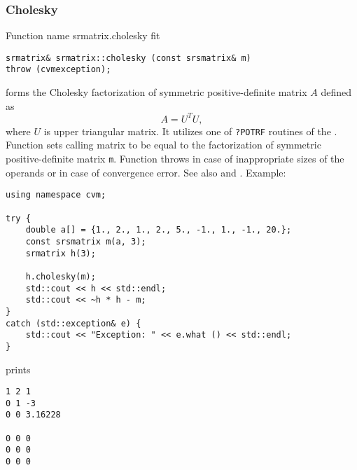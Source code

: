 \subsubsection{Cholesky}
Function%
\pdfdest name {srmatrix.cholesky} fit
\begin{verbatim}
srmatrix& srmatrix::cholesky (const srsmatrix& m)
throw (cvmexception);
\end{verbatim}
forms the Cholesky factorization of  symmetric positive-definite 
matrix $A$ defined as
\begin{equation*}
A=U^T U,
\end{equation*}
where $U$ is upper triangular matrix.
It utilizes one of \verb"?POTRF" routines of the
.
Function
sets  calling matrix to be equal to the factorization
of  symmetric 
positive-definite matrix \verb"m".
Function throws 
in case of inappropriate sizes of the operands
or in case of convergence error.
See also
 and
.
Example:
\begin{Verbatim}
using namespace cvm;

try {
    double a[] = {1., 2., 1., 2., 5., -1., 1., -1., 20.};
    const srsmatrix m(a, 3);
    srmatrix h(3);

    h.cholesky(m);
    std::cout << h << std::endl;
    std::cout << ~h * h - m;
}
catch (std::exception& e) {
    std::cout << "Exception: " << e.what () << std::endl;
}
\end{Verbatim}
prints
\begin{Verbatim}
1 2 1
0 1 -3
0 0 3.16228

0 0 0
0 0 0
0 0 0
\end{Verbatim}
\newpage




